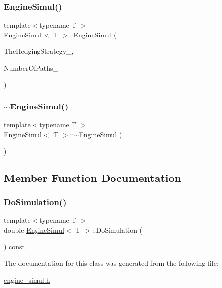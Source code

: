 \subsubsection{\texorpdfstring{Engine\+Simul()}{EngineSimul()}}
{\footnotesize\ttfamily template$<$typename T $>$ \\
\hyperlink{classEngineSimul}{Engine\+Simul}$<$ T $>$\+::\hyperlink{classEngineSimul}{Engine\+Simul} (\begin{DoxyParamCaption}\item[{shared\+\_\+ptr$<$ \hyperlink{classHedgingStrategy}{Hedging\+Strategy}$<$ T $>$$>$}]{The\+Hedging\+Strategy\+\_\+,  }\item[{unsigned long}]{Number\+Of\+Paths\+\_\+ }\end{DoxyParamCaption})}

\hypertarget{classEngineSimul_a82c248f5bd2d2b65348e0fec22c2a0e1}{}\label{classEngineSimul_a82c248f5bd2d2b65348e0fec22c2a0e1} 
\subsubsection{\texorpdfstring{$\sim$\+Engine\+Simul()}{~EngineSimul()}}
{\footnotesize\ttfamily template$<$typename T $>$ \\
\hyperlink{classEngineSimul}{Engine\+Simul}$<$ T $>$\+::$\sim$\hyperlink{classEngineSimul}{Engine\+Simul} (\begin{DoxyParamCaption}{ }\end{DoxyParamCaption})\hspace{0.3cm}{\ttfamily [inline]}}



\subsection{Member Function Documentation}
\hypertarget{classEngineSimul_a7a7733a90fcc7e20bf4e0a3b9eb03d6d}{}\label{classEngineSimul_a7a7733a90fcc7e20bf4e0a3b9eb03d6d} 
\subsubsection{\texorpdfstring{Do\+Simulation()}{DoSimulation()}}
{\footnotesize\ttfamily template$<$typename T $>$ \\
double \hyperlink{classEngineSimul}{Engine\+Simul}$<$ T $>$\+::Do\+Simulation (\begin{DoxyParamCaption}{ }\end{DoxyParamCaption}) const}



The documentation for this class was generated from the following file\+:\begin{DoxyCompactItemize}
\item 
\hyperlink{engine__simul_8h}{engine\+\_\+simul.\+h}\end{DoxyCompactItemize}
